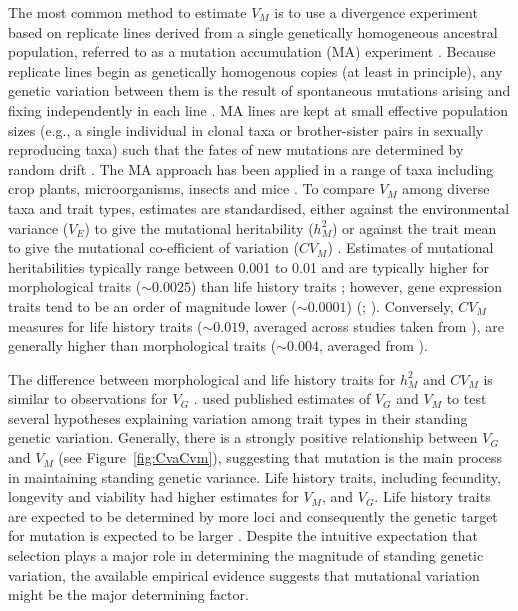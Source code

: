 The most common method to estimate $V_M$ is to use a divergence experiment based on replicate lines derived from a single genetically homogeneous ancestral population, referred to as a mutation accumulation (MA) experiment \citep{Muka64, John05, Hall09}. Because replicate lines begin as genetically homogenous copies (at least in principle), any genetic variation between them is the result of spontaneous mutations arising and fixing independently in each line \citep{Hall09}. MA lines are kept at small effective population sizes (e.g., a single individual in clonal taxa or brother-sister pairs in sexually reproducing taxa) such that the fates of new mutations are determined by random drift \citep{Lync98c12}. The MA approach has been applied in a range of taxa including crop plants, microorganisms, insects and mice \citep{Houl96, Lync99}. To compare $V_M$ among diverse taxa and trait types, estimates are standardised, either against the environmental variance ($V_E$) to give the mutational heritability ($h_M^2$) or against the trait mean to give the mutational co-efficient of variation ($CV_M$) \citep{Houl96, Hall09}. Estimates of mutational heritabilities typically range between 0.001 to 0.01 and are typically higher for morphological traits ($\sim0.0025$) than life history traits \citep[$\sim0.0013$][]{Lync99}; however, gene expression traits tend to be an order of magnitude lower ($\sim0.0001$) (\citealp{Denv05, Rifk05, Land07}; \citealp[but see][]{McGu14b}). Conversely, $CV_M$ measures for life history traits ($\sim0.019$, averaged across studies taken from \citealt{Houl96, Hall09}), are generally higher than morphological traits ($\sim0.004$, averaged from \citealt{Houl96}). \par

The difference between morphological and life history traits for $h_M^2$ and $CV_M$ is similar to observations for $V_G$ \citep{Houl92a}.  \citet{Houl92a} used published estimates of $V_G$ and $V_M$ to test several hypotheses explaining variation among trait types in their standing genetic variation. Generally, there is a strongly positive relationship between $V_G$ and $V_M$ (see Figure~\ref{fig:CvaCvm}), suggesting that mutation is the main process in maintaining standing genetic variance. Life history traits, including fecundity, longevity and viability had higher estimates for $V_M$, and $V_G$. Life history traits are expected to be determined by more loci and consequently the genetic target for mutation is expected to be larger \citep{Houl98}. Despite the intuitive expectation that selection plays a major role in determining the magnitude of standing genetic variation, the available empirical evidence suggests that mutational variation might be the major determining factor. \par

